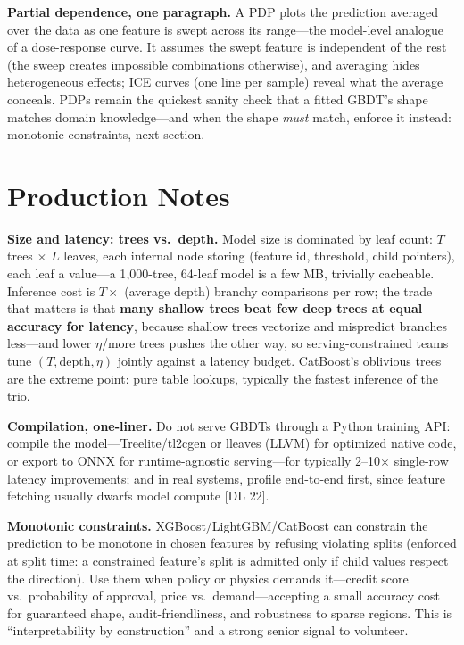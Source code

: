 \textbf{Partial dependence, one paragraph.} A PDP plots the prediction averaged over the data as one feature is swept across its range---the model-level analogue of a dose-response curve. It assumes the swept feature is independent of the rest (the sweep creates impossible combinations otherwise), and averaging hides heterogeneous effects; ICE curves (one line per sample) reveal what the average conceals. PDPs remain the quickest sanity check that a fitted GBDT's shape matches domain knowledge---and when the shape \textit{must} match, enforce it instead: monotonic constraints, next section.

\section{Production Notes}
\label{cml:sec:production}

\textbf{Size and latency: trees vs.\ depth.} Model size is dominated by leaf count: $T$ trees $\times$ $L$ leaves, each internal node storing (feature id, threshold, child pointers), each leaf a value---a 1{,}000-tree, 64-leaf model is a few MB, trivially cacheable. Inference cost is $T \times$ (average depth) branchy comparisons per row; the trade that matters is that \textbf{many shallow trees beat few deep trees at equal accuracy for latency}, because shallow trees vectorize and mispredict branches less---and lower $\eta$/more trees pushes the other way, so serving-constrained teams tune $(T, \text{depth}, \eta)$ jointly against a latency budget. CatBoost's oblivious trees are the extreme point: pure table lookups, typically the fastest inference of the trio.

\textbf{Compilation, one-liner.} Do not serve GBDTs through a Python training API: compile the model---Treelite/tl2cgen or lleaves (LLVM) for optimized native code, or export to ONNX for runtime-agnostic serving---for typically 2--10$\times$ single-row latency improvements; and in real systems, profile end-to-end first, since feature fetching usually dwarfs model compute [DL 22].

\textbf{Monotonic constraints.} XGBoost/LightGBM/CatBoost can constrain the prediction to be monotone in chosen features by refusing violating splits (enforced at split time: a constrained feature's split is admitted only if child values respect the direction). Use them when policy or physics demands it---credit score vs.\ probability of approval, price vs.\ demand---accepting a small accuracy cost for guaranteed shape, audit-friendliness, and robustness to sparse regions. This is ``interpretability by construction'' and a strong senior signal to volunteer.

